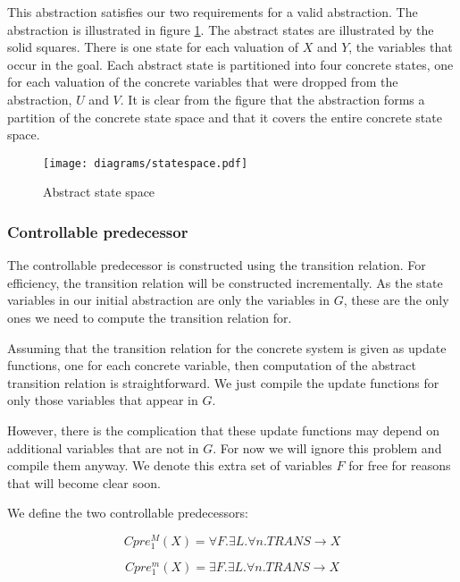 \documentclass[a4paper,twoside,openright,11pt]{book}
\theoremstyle{definition}
\begin{document}
This abstraction satisfies our two requirements for a valid abstraction. The abstraction is illustrated in figure \ref{fig:abs_state_sp}. The abstract states are illustrated by the solid squares. There is one state for each valuation of $X$ and $Y$, the variables that occur in the goal. Each abstract state is partitioned into four concrete states, one for each valuation of the concrete variables that were dropped from the abstraction, $U$ and $V$. It is clear from the figure that the abstraction forms a partition of the concrete state space and that it covers the entire concrete state space.

\begin{figure}[t]
\centering
\texttt{[image: diagrams/statespace.pdf]}
\caption{Abstract state space}
\label{fig:abs_state_sp}
\end{figure}

\subsubsection{Controllable predecessor}

The controllable predecessor is constructed using the transition relation. For efficiency, the transition relation will be constructed incrementally. As the state variables in our initial abstraction are only the variables in $G$, these are the only ones we need to compute the transition relation for.

Assuming that the transition relation for the concrete system is given as update functions, one for each concrete variable, then computation of the abstract transition relation is straightforward. We just compile the update functions for only those variables that appear in $G$.

However, there is the complication that these update functions may depend on additional variables that are not in $G$. For now we will ignore this problem and compile them anyway. We denote this extra set of variables $F$ for free for reasons that will become clear soon.

We define the two controllable predecessors:

\begin{equation}
    Cpre_1^M(X) = \forall F. \exists L. \forall n. TRANS \rightarrow X
\end{equation}

\begin{equation}
    Cpre_1^m(X) = \exists F. \exists L. \forall n. TRANS \rightarrow X
\end{equation}
\end{document}
